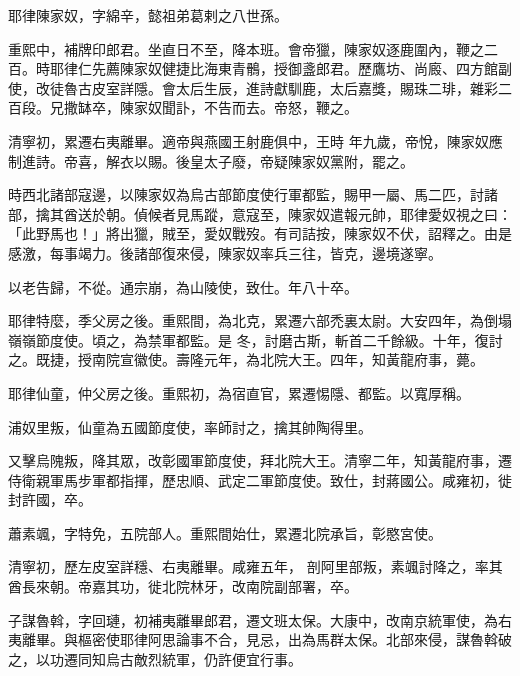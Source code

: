 \begin{pinyinscope}
 耶律陳家奴，字綿辛，懿祖弟葛剌之八世孫。



 重熙中，補牌印郎君。坐直日不至，降本班。會帝獵，陳家奴逐鹿圍內，鞭之二百。時耶律仁先薦陳家奴健捷比海東青鶻，授御盞郎君。歷鷹坊、尚廄、四方館副使，改徒魯古皮室詳隱。會太后生辰，進詩獻馴鹿，太后嘉獎，賜珠二琲，雜彩二百段。兄撒缽卒，陳家奴聞訃，不告而去。帝怒，鞭之。



 清寧初，累遷右夷離畢。適帝與燕國王射鹿俱中，王時
 年九歲，帝悅，陳家奴應制進詩。帝喜，解衣以賜。後皇太子廢，帝疑陳家奴黨附，罷之。



 時西北諸部寇邊，以陳家奴為烏古部節度使行軍都監，賜甲一屬、馬二匹，討諸部，擒其酋送於朝。偵候者見馬蹤，意寇至，陳家奴遣報元帥，耶律愛奴視之曰：「此野馬也！」將出獵，賊至，愛奴戰歿。有司詰按，陳家奴不伏，詔釋之。由是感激，每事竭力。後諸部復來侵，陳家奴率兵三往，皆克，邊境遂寧。



 以老告歸，不從。通宗崩，為山陵使，致仕。年八十卒。



 耶律特麼，季父房之後。重熙間，為北克，累遷六部禿裏太尉。大安四年，為倒塌嶺嶺節度使。頃之，為禁軍都監。是
 冬，討磨古斯，斬首二千餘級。十年，復討之。既捷，授南院宣徽使。壽隆元年，為北院大王。四年，知黃龍府事，薨。



 耶律仙童，仲父房之後。重熙初，為宿直官，累遷惕隱、都監。以寬厚稱。



 浦奴里叛，仙童為五國節度使，率師討之，擒其帥陶得里。



 又擊烏隗叛，降其眾，改彰國軍節度使，拜北院大王。清寧二年，知黃龍府事，遷侍衛親軍馬步軍都指揮，歷忠順、武定二軍節度使。致仕，封蔣國公。咸雍初，徙封許國，卒。



 蕭素颯，字特免，五院部人。重熙間始仕，累遷北院承旨，彰愍宮使。



 清寧初，歷左皮室詳穩、右夷離畢。咸雍五年，
 剖阿里部叛，素颯討降之，率其酋長來朝。帝嘉其功，徙北院林牙，改南院副部署，卒。



 子謀魯斡，字回璉，初補夷離畢郎君，遷文班太保。大康中，改南京統軍使，為右夷離畢。與樞密使耶律阿思論事不合，見忌，出為馬群太保。北部來侵，謀魯斡破之，以功遷同知烏古敵烈統軍，仍許便宜行事。




\end{pinyinscope}
